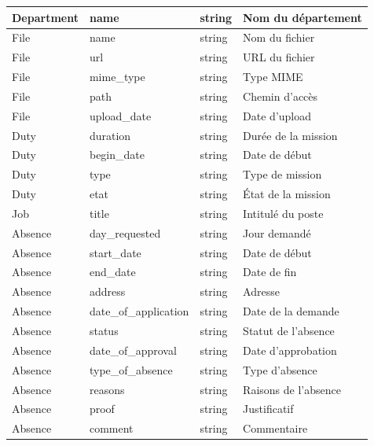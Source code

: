 \begin{longtable}{|p{3.5cm}|p{3.5cm}|p{3cm}|p{5cm}|}
    Department & name & string & Nom du département \\
    \hline

    File & name & string & Nom du fichier \\
    \hline
    File & url & string & URL du fichier \\
    \hline
    File & mime\_type & string & Type MIME \\
    \hline
    File & path & string & Chemin d'accès \\
    \hline
    File & upload\_date & string & Date d'upload \\
    \hline

    Duty & duration & string & Durée de la mission \\
    \hline
    Duty & begin\_date & string & Date de début \\
    \hline
    Duty & type & string & Type de mission \\
    \hline
    Duty & etat & string & État de la mission \\
    \hline

    Job & title & string & Intitulé du poste \\
    \hline

    Absence & day\_requested & string & Jour demandé \\
    \hline
    Absence & start\_date & string & Date de début \\
    \hline
    Absence & end\_date & string & Date de fin \\
    \hline
    Absence & address & string & Adresse \\
    \hline
    Absence & date\_of\_application & string & Date de la demande \\
    \hline
    Absence & status & string & Statut de l'absence \\
    \hline
    Absence & date\_of\_approval & string & Date d'approbation \\
    \hline
    Absence & type\_of\_absence & string & Type d'absence \\
    \hline
    Absence & reasons & string & Raisons de l'absence \\
    \hline
    Absence & proof & string & Justificatif \\
    \hline
    Absence & comment & string & Commentaire \\
    \hline

\end{longtable}




